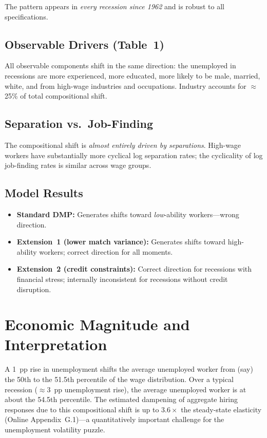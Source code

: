 The pattern appears in \emph{every recession since 1962} and is robust to all
specifications.

\subsection*{Observable Drivers (Table~1)}

All observable components shift in the same direction: the unemployed in
recessions are more experienced, more educated, more likely to be male,
married, white, and from high-wage industries and occupations. Industry
accounts for $\approx$25\% of total compositional shift.

\subsection*{Separation vs.\ Job-Finding}

The compositional shift is \emph{almost entirely driven by separations}.
High-wage workers have substantially more cyclical log separation rates;
the cyclicality of log job-finding rates is similar across wage groups.

\subsection*{Model Results}

\begin{itemize}
  \item \textbf{Standard DMP:} Generates shifts toward \emph{low}-ability
    workers---wrong direction.
  \item \textbf{Extension~1 (lower match variance):} Generates shifts toward
    high-ability workers; correct direction for all moments.
  \item \textbf{Extension~2 (credit constraints):} Correct direction for
    recessions with financial stress; internally inconsistent for recessions
    without credit disruption.
\end{itemize}

\section{Economic Magnitude and Interpretation}

A 1~pp rise in unemployment shifts the average unemployed worker from (say)
the 50th to the 51.5th percentile of the wage distribution. Over a typical
recession ($\approx$3~pp unemployment rise), the average unemployed worker
is at about the 54.5th percentile. The estimated dampening of aggregate
hiring responses due to this compositional shift is up to $3.6\times$ the
steady-state elasticity (Online Appendix~G.1)---a quantitatively important
challenge for the unemployment volatility puzzle.

